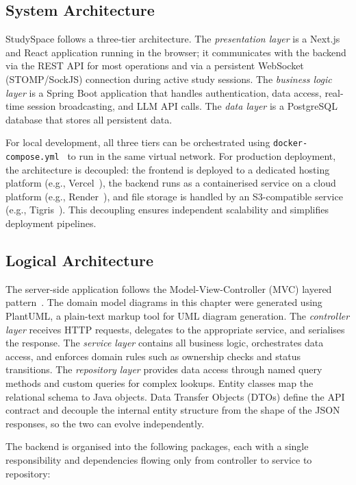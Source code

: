 \subsection{System Architecture}
\label{subsec:system-architecture}
StudySpace follows a three-tier architecture. The \emph{presentation layer} is a Next.js and
React application running in the browser; it communicates with the backend via the REST API for
most operations and via a persistent WebSocket (STOMP/SockJS) connection during active study
sessions. The \emph{business logic layer} is a Spring Boot application that handles authentication,
data access, real-time session broadcasting, and LLM API calls. The \emph{data layer} is a
PostgreSQL database that stores all persistent data.

For local development, all three tiers can be orchestrated using \texttt{docker-\allowbreak compose.yml}~\cite{DockerCompose}
to run in the same virtual network. For production deployment, the architecture is decoupled: the frontend
is deployed to a dedicated hosting platform (e.g., Vercel~\cite{Vercel}), the backend runs as a containerised
service on a cloud platform (e.g., Render~\cite{Render}), and file storage is handled by an S3-compatible service
(e.g., Tigris~\cite{Tigris}). This decoupling ensures independent scalability and simplifies deployment pipelines.


\subsection{Logical Architecture}
\label{subsec:logical-architecture}

The server-side application follows the Model-View-Controller (MVC) layered pattern~\cite{FowlerEAA,RichardsSAP}. The domain model diagrams in this chapter were generated using PlantUML, a plain-text markup tool for UML diagram generation. The \emph{controller layer} receives HTTP requests, delegates to the appropriate service, and serialises the response. The \emph{service layer} contains all business logic, orchestrates data access, and enforces domain rules such as ownership checks and status transitions. The \emph{repository layer} provides data access through named query methods and custom queries for complex lookups. Entity classes map the relational schema to Java objects. Data Transfer Objects (DTOs) define the API contract and decouple the internal entity structure from the shape of the JSON responses, so the two can evolve independently.

The backend is organised into the following packages, each with a single responsibility and
dependencies flowing only from controller to service to repository:

